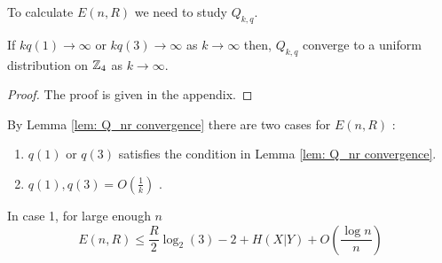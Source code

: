 To calculate $E(n,R)$ we need to study $ Q_{k,q}$.
\begin{lem}\label{lem: Q_nr convergence}
If $kq(1)\rightarrow \infty$ or $kq(3)\rightarrow \infty$ as $k \rightarrow \infty$ then, $Q_{k,q}$ converge to a uniform distribution on $\mathbb{Z}_4$ as $k \rightarrow \infty$.
\end{lem}

\begin{proof}
The proof is given in the appendix.
\end{proof}

By Lemma \ref{lem: Q_nr convergence} there are two cases for $E(n,R)$ :

\begin{enumerate}
\item $q(1)$ or $q(3)$ satisfies the condition in Lemma \ref{lem: Q_nr convergence}.
\item $q(1),q(3)=O(\frac{1}{k})$ . 
\end{enumerate}


\begin{lem}\label{lem: p_err3, Case 1}
In case 1, for large enough $n$ 
\begin{equation*}
E(n,R) \leq  \frac{R}{2}\log_2(3) -2+H(X|Y) +O(\frac{\log n}{n})
\end{equation*}

\end{lem}


